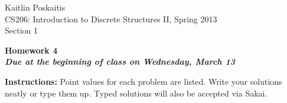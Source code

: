 \documentclass[11pt]{article}
\begin{document}
\sloppy

\noindent Kaitlin Poskaitis\\
CS206: Introduction to Discrete Structures II, Spring 2013\\
Section 1\\

\begin{center}
\LARGE{\textbf{Homework 4}}\\
\large{\textbf{\emph{Due at the beginning of class on Wednesday, March 13}}}
\end{center}

\vspace{.1in}

\noindent\textbf{Instructions:} Point values for each problem are listed.
Write your solutions neatly or type them up.  Typed solutions will also be
accepted via Sakai.
\end{document}

